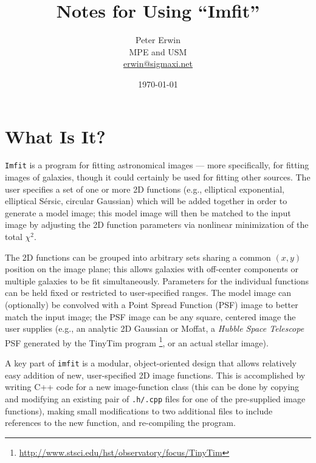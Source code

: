 \documentclass[10pt]{article}
\newcommand{\imfit}{\texttt{imfit}}
\newcommand{\Imfit}{\texttt{Imfit}}
\begin{document}
\title{
  Notes for Using ``Imfit''
}
\author{
  Peter Erwin\\
  MPE and USM\\
  \href{mailto:erwin@sigmaxi.net}{erwin@sigmaxi.net}
}
\date{\today}  %

\maketitle

\tableofcontents


\section{What Is It?}

\Imfit{} is a program for fitting astronomical images --- more
specifically, for fitting images of galaxies, though it could certainly
be used for fitting other sources. The user specifies a set of one or
more 2D functions (e.g., elliptical exponential, elliptical S\'ersic,
circular Gaussian) which will be added together in order to generate a
model image; this model image will then be matched to the input image by
adjusting the 2D function parameters via nonlinear minimization of the total
$\chi^2$.

The 2D functions can be grouped into arbitrary sets sharing a common $(x,y)$
position on the image plane; this allows galaxies with off-center components
or multiple galaxies to be fit simultaneously. Parameters for the individual
functions can be held fixed or restricted to user-specified ranges. The
model image can (optionally) be convolved with a Point Spread
Function (PSF) image to better match the input image; the PSF image can
be any square, centered image the user supplies (e.g., an analytic 2D Gaussian
or Moffat, a \textit{Hubble Space Telescope} PSF generated by the TinyTim
program \cite{krist95}\footnote{\url{http://www.stsci.edu/hst/observatory/focus/TinyTim}}, 
or an actual stellar image).

A key part of \imfit{} is a modular, object-oriented design
that allows relatively easy addition of new, user-specified 2D image
functions. This is accomplished by writing C++ code for a new
image-function class (this can be done by copying and modifying an
existing pair of \texttt{.h/.cpp} files for one of the pre-supplied
image functions), making small modifications to two additional files to include references to
the new function, and re-compiling the program. 
\end{document}

